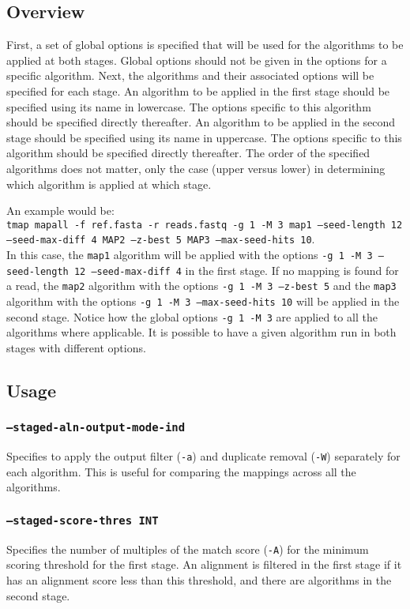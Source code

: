 \documentclass[a4paper,12pt]{book}
\newcommand{\TT}[1]{{\tt #1}} %
\begin{document}
\subsection{Overview}
First, a set of global options is specified that will be used for the algorithms to be applied at both stages.
Global options should not be given in the options for a specific algorithm.
Next, the algorithms and their associated options will be specified for each stage.
An algorithm to be applied in the first stage should be specified using its name in lowercase.
The options specific to this algorithm should be specified directly thereafter.
An algorithm to be applied in the second stage should be specified using its name in uppercase.
The options specific to this algorithm should be specified directly thereafter.
The order of the specified algorithms does not matter, only the case (upper versus lower) in determining which algorithm is applied at which stage.

An example would be:\\
\TT{tmap mapall -f ref.fasta -r reads.fastq -g 1 -M 3 map1 --seed-length 12 --seed-max-diff 4 MAP2 --z-best 5 MAP3 --max-seed-hits 10}.\\
In this case, the \TT{map1} algorithm will be applied with the options \TT{-g 1 -M 3 --seed-length 12 --seed-max-diff 4} in the first stage.
If no mapping is found for a read, the \TT{map2} algorithm with the options \TT{-g 1 -M 3 --z-best 5} and the \TT{map3} algorithm with the options \TT{-g 1 -M 3 --max-seed-hits 10} will be applied in the second stage.
Notice how the global options \TT{-g 1 -M 3} are applied to all the algorithms where applicable.
It is possible to have a given algorithm run in both stages with different options.

\subsection{Usage}
\subsubsection{\TT{--staged-aln-output-mode-ind}}
Specifies to apply the output filter (\TT{-a}) and duplicate removal (\TT{-W}) separately for each algorithm.
This is useful for comparing the mappings across all the algorithms.

\subsubsection{\TT{--staged-score-thres INT}}
Specifies the number of multiples of the match score (\TT{-A}) for the minimum scoring threshold for the first stage.
An alignment is filtered in the first stage if it has an alignment score less than this threshold, and there are algorithms in the second stage.
\end{document}
